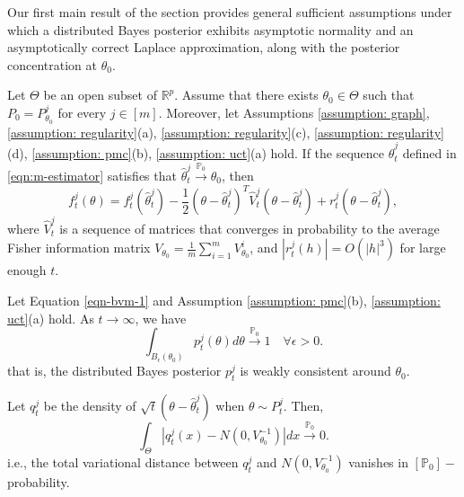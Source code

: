 \documentclass[twoside,11pt]{article}
\numberwithin{equation}{section}
\newcommand{\R}{{\mathbb{R}}}
\newcommand\bP{\mathbb{P}}
\newcommand{\pto}{\stackrel{\bP_0}{\to}}
\begin{document}
{Our first main result of the section provides general sufficient assumptions under which a distributed Bayes posterior exhibits asymptotic normality and an asymptotically correct Laplace approximation, along
with the posterior concentration at $\theta_0$. 
\begin{theorem}[BvM]
\label{thm:bvm1}
Let $\Theta$ be an open subset of $\R^p$. Assume that there exists $\theta_0 \in \Theta$ such that $P_0 = P_{\theta_0}^j$ for every $j \in [m]$. Moreover, let Assumptions \ref{assumption: graph},  \ref{assumption: regularity}(a), \ref{assumption: regularity}(c), \ref{assumption: regularity}(d), \ref{assumption: pmc}(b), \ref{assumption: uct}(a)  hold.  If the sequence $\hat \theta_t^j$ defined in \eqref{eqn:m-estimator} satisfies that $\hat \theta_t^j \pto \theta_0$, then 
\begin{equation} \label{eqn-bvm-1}
  f_t^j(\theta)  = f_t^j(\hat \theta_t^j) - \frac{1}{2}(\theta - \hat \theta_t^j)^T \hat V_t^j (\theta -\hat \theta_t^j) + r_t^j(\theta -\hat \theta_t^j),  
\end{equation}
where $\hat V_t^j$ is a sequence of matrices that converges in probability to the average Fisher information matrix $V_{\theta_0} = \frac{1}{m} \sum_{i = 1}^m V_{\theta_0}^i$, and $|r_t^j(h)| = O(|h|^3)$ for large enough $t$. 

Let Equation \eqref{eqn-bvm-1} and Assumption \ref{assumption: pmc}(b), \ref{assumption: uct}(a) hold. As $t \to \infty$, we have 
\begin{equation} \label{eqn-bvm-2}
   \int_{B_\epsilon(\theta_0)} p_t^j(\theta) d\theta \pto 1 \quad \forall \epsilon >0. 
\end{equation}
that is, the distributed Bayes posterior $p_t^j$ is weakly consistent around $\theta_0$.

Let $q_t^j$ be the density of $\sqrt{t}(\theta -\hat \theta_t^j)$ when $\theta \sim P_t^j$. Then, 
\begin{equation} \label{eqn-bvm-3}
    \int_\Theta \left|q_t^j(x) - N(0, V_{\theta_0}^{-1}) \right| dx \pto 0. 
\end{equation}
i.e., the total variational distance between $q_t^j$ and $N(0, V_{\theta_0}^{-1})$ vanishes in $[\bP_0]-$probability.  
\end{theorem}

}
\end{document}
